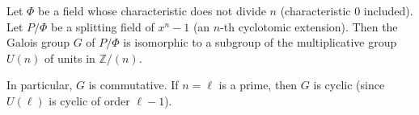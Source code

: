 Let $\Phi$ be a field whose characteristic does not divide $n$ (characteristic 0 included). Let $P/\Phi$ be a splitting field of $x^n - 1$ (an $n$-th cyclotomic extension). Then the Galois group $G$ of $P/\Phi$ is isomorphic to a subgroup of the multiplicative group $U(n)$ of units in $\mathbb{Z}/(n)$.

In particular, $G$ is commutative. If $n = \ell$ is a prime, then $G$ is cyclic (since $U(\ell)$ is cyclic of order $\ell - 1$).
